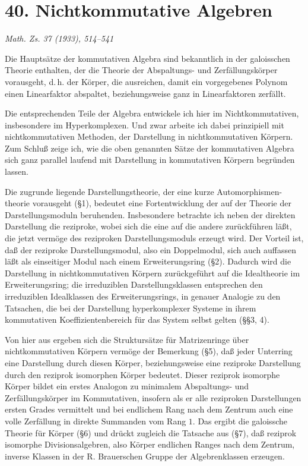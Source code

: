 \documentclass[11pt]{article}
\begin{document}
\clearpage

\section*{40. Nichtkommutative Algebren}

\begin{center}
\emph{Math. Zs. 37 (1933), 514--541}
\end{center}

Die Hauptsätze der kommutativen Algebra sind bekanntlich in der galoisschen Theorie enthalten, der die Theorie der Abspaltungs- und Zerfällungskörper vorausgeht, d.\,h. der Körper, die ausreichen, damit ein vorgegebenes Polynom einen Linearfaktor abspaltet, beziehungsweise ganz in Linearfaktoren zerfällt.

Die entsprechenden Teile der Algebra entwickele ich hier im Nichtkommutativen, insbesondere im Hyperkomplexen. Und zwar arbeite ich dabei prinzipiell mit nichtkommutativen Methoden, der Darstellung in nichtkommutativen Körpern. Zum Schluß zeige ich, wie die oben genannten Sätze der kommutativen Algebra sich ganz parallel laufend mit Darstellung in kommutativen Körpern begründen lassen.

Die zugrunde liegende Darstellungstheorie, der eine kurze Automorphismen-theorie vorausgeht (§1), bedeutet eine Fortentwicklung der auf der Theorie der Darstellungsmoduln beruhenden. Insbesondere betrachte ich neben der direkten Darstellung die reziproke, wobei sich die eine auf die andere zurückführen läßt, die jetzt vermöge des reziproken Darstellungsmoduls erzeugt wird. Der Vorteil ist, daß der reziproke Darstellungsmodul, also ein Doppelmodul, sich auch auffassen läßt als einseitiger Modul nach einem Erweiterungsring (§2). Dadurch wird die Darstellung in nichtkommutativen Körpern zurückgeführt auf die Idealtheorie im Erweiterungsring; die irreduziblen Darstellungsklassen entsprechen den irreduziblen Idealklassen des Erweiterungsrings, in genauer Analogie zu den Tatsachen, die bei der Darstellung hyperkomplexer Systeme in ihrem kommutativen Koeffizientenbereich für das System selbst gelten (§§3, 4).

Von hier aus ergeben sich die Struktursätze für Matrizenringe über nichtkommutativen Körpern vermöge der Bemerkung (§5), daß jeder Unterring eine Darstellung durch diesen Körper, beziehungsweise eine reziproke Darstellung durch den reziprok isomorphen Körper bedeutet. Dieser reziprok isomorphe Körper bildet ein erstes Analogon zu minimalem Abspaltungs- und Zerfällungskörper im Kommutativen, insofern als er alle reziproken Darstellungen ersten Grades vermittelt und bei endlichem Rang nach dem Zentrum auch eine volle Zerfällung in direkte Summanden vom Rang \(1\). Das ergibt die galoissche Theorie für Körper (§6) und drückt zugleich die Tatsache aus (§7), daß reziprok isomorphe Divisionsalgebren, also Körper endlichen Ranges nach dem Zentrum, inverse Klassen in der R. Brauerschen Gruppe der Algebrenklassen erzeugen.
\end{document}
